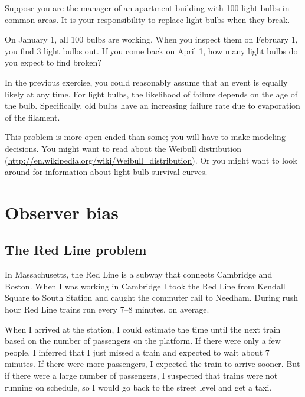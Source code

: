 \documentclass[12pt]{book}
\begin{document}
\begin{exercise}

Suppose you are the manager of an apartment building with
100 light bulbs in common areas.  It is your responsibility
to replace light bulbs when they break.

On January 1, all 100 bulbs are working.  When you inspect
them on February 1, you find 3 light bulbs out.  If you
come back on April 1, how many light bulbs do you expect to
find broken?

In the previous exercise, you could reasonably assume that an event is
equally likely at any time.  For light bulbs, the likelihood of
failure depends on the age of the bulb.  Specifically, old bulbs
have an increasing failure rate due to evaporation of the filament.

This problem is more open-ended than some; you will have to make
modeling decisions.  You might want to read about the Weibull
distribution
(\url{http://en.wikipedia.org/wiki/Weibull_distribution}).
Or you might want to look around for information about
light bulb survival curves.

\end{exercise}


\chapter{Observer bias}
\label{observer}

\section{The Red Line problem}

In Massachusetts, the Red Line is a subway that connects
Cambridge and Boston.  When I was working in Cambridge I took the Red
Line from Kendall Square to South Station and caught the commuter rail
to Needham.  During rush hour Red Line trains run every 7--8
minutes, on average.

When I arrived at the station, I could estimate the time until
the next train based on the number of passengers on the platform.
If there were only a few people, I inferred that I just missed
a train and expected to wait about 7 minutes.  If there were
more passengers, I expected the train to arrive sooner.  But if
there were a large number of passengers, I suspected that
trains were not running on schedule, so I would go back to the
street level and get a taxi.
\end{document}
